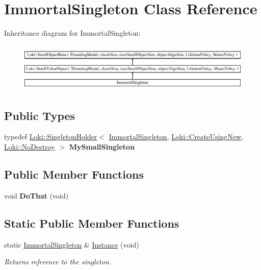 \hypertarget{classImmortalSingleton}{}\section{Immortal\+Singleton Class Reference}
\label{classImmortalSingleton}
Inheritance diagram for Immortal\+Singleton\+:\begin{figure}[H]
\begin{center}
\leavevmode
\includegraphics[height=2.349650cm]{classImmortalSingleton}
\end{center}
\end{figure}
\subsection*{Public Types}
\begin{DoxyCompactItemize}
\item 
\hypertarget{classImmortalSingleton_ae1c15eeac6591497165d3b400aceec32}{}typedef \hyperlink{classLoki_1_1SingletonHolder}{Loki\+::\+Singleton\+Holder}$<$ \hyperlink{classImmortalSingleton}{Immortal\+Singleton}, \hyperlink{structLoki_1_1CreateUsingNew}{Loki\+::\+Create\+Using\+New}, \hyperlink{structLoki_1_1NoDestroy}{Loki\+::\+No\+Destroy} $>$ {\bfseries My\+Small\+Singleton}\label{classImmortalSingleton_ae1c15eeac6591497165d3b400aceec32}

\end{DoxyCompactItemize}
\subsection*{Public Member Functions}
\begin{DoxyCompactItemize}
\item 
\hypertarget{classImmortalSingleton_a50575286050eec24a57e835024543856}{}void {\bfseries Do\+That} (void)\label{classImmortalSingleton_a50575286050eec24a57e835024543856}

\end{DoxyCompactItemize}
\subsection*{Static Public Member Functions}
\begin{DoxyCompactItemize}
\item 
\hypertarget{classImmortalSingleton_a1248b815b5fa205957ec8915fec9f094}{}static \hyperlink{classImmortalSingleton}{Immortal\+Singleton} \& \hyperlink{classImmortalSingleton_a1248b815b5fa205957ec8915fec9f094}{Instance} (void)\label{classImmortalSingleton_a1248b815b5fa205957ec8915fec9f094}

\begin{DoxyCompactList}\small\item\em Returns reference to the singleton. \end{DoxyCompactList}\end{DoxyCompactItemize}
